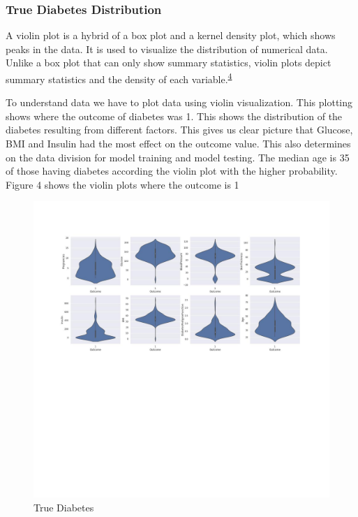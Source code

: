 \documentclass[
]{article}
\begin{document}
\hypertarget{true-diabetes-distribution}{%
\subsubsection{True Diabetes
Distribution}\label{true-diabetes-distribution}}

A violin plot is a hybrid of a box plot and a kernel density plot, which
shows peaks in the data. It is used to visualize the distribution of
numerical data. Unlike a box plot that can only show summary statistics,
violin plots depict summary statistics and the density of each
variable.\textsuperscript{\protect\hyperlink{ref-joel}{4}}

To understand data we have to plot data using violin visualization. This
plotting shows where the outcome of diabetes was 1. This shows the
distribution of the diabetes resulting from different factors. This
gives us clear picture that Glucose, BMI and Insulin had the most effect
on the outcome value. This also determines on the data division for
model training and model testing. The median age is 35 of those having
diabetes according the violin plot with the higher probability. Figure 4
shows the violin plots where the outcome is 1

\begin{figure}
\centering
\includegraphics{truediab.jpg}
\caption{True Diabetes}
\end{figure}
\end{document}
